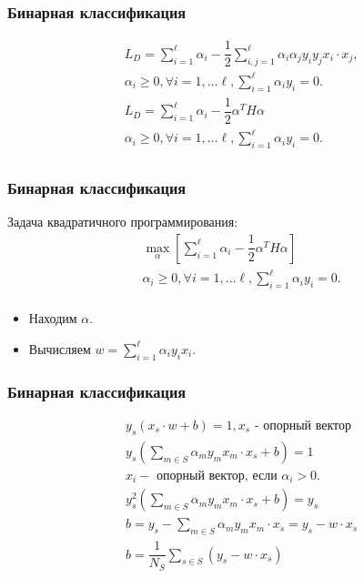 \documentclass[14pt]{beamer}
\begin{document}
\begin{frame}
\frametitle{Бинарная классификация}
\begin{align*}
  &L_D = \sum\limits_{i = 1}^{\ell}\alpha_i - \dfrac{1}{2}
  \sum\limits_{i, j = 1}^{\ell}\alpha_i\alpha_jy_iy_j x_i \cdot x_j,\\
  &\alpha_i \geqslant 0, \forall i = 1, \ldots \ell,
  \sum\limits_{i = 1}^{\ell}\alpha_iy_i = 0.\\
  &L_D = \sum\limits_{i = 1}^{\ell}\alpha_i - \dfrac{1}{2}\alpha^TH\alpha\\
  &\alpha_i \geqslant 0, \forall i = 1, \ldots \ell,
  \sum\limits_{i = 1}^{\ell}\alpha_iy_i = 0.\\
\end{align*}
\end{frame}

\begin{frame}
\frametitle{Бинарная классификация}
Задача квадратичного программирования:
\begin{align*}
  &\underset{\alpha}{\max}\left[\sum\limits_{i = 1}^{\ell}\alpha_i - \dfrac{1}{2}\alpha^TH\alpha\right]\\
  &\alpha_i \geqslant 0, \forall i = 1, \ldots \ell,
   \sum\limits_{i = 1}^{\ell}\alpha_iy_i = 0.\\
\end{align*}

\begin{itemize}
  \item<2-> Находим $\alpha$.
  \item<3-> Вычисляем $w = \sum\limits_{i = 1}^{\ell}\alpha_iy_ix_i$.
\end{itemize}
\end{frame}

\begin{frame}
\frametitle{Бинарная классификация}
\begin{align*}
  &y_s(x_s \cdot w + b) = 1, x_s \text{ - опорный вектор}\\
  &y_s\left(\sum\limits_{m \in S}\alpha_m y_m x_m \cdot x_s + b\right) = 1\\
  &x_i - \text{ опорный вектор, если } \alpha_i > 0.\\
  &y_s^2\left(\sum\limits_{m \in S}\alpha_m y_m x_m \cdot x_s + b\right) = y_s\\
  &b = y_s - \sum\limits_{m \in S}\alpha_m y_m x_m \cdot x_s = y_s - w \cdot x_s\\
  &b = \dfrac{1}{N_S}\sum\limits_{s \in S}\left(y_s - w \cdot x_s \right)
\end{align*}
\end{frame}
\end{document}
